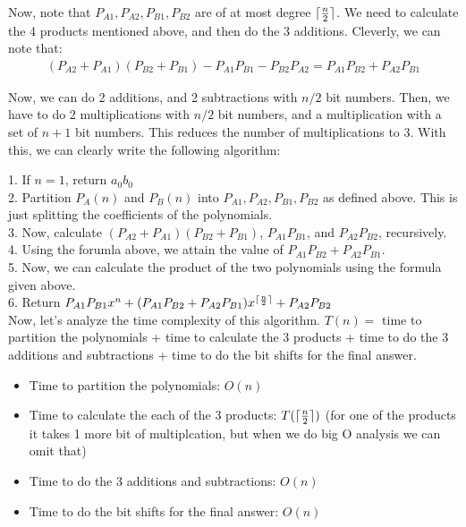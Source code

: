 \documentclass[a4paper]{article}
\DeclarePairedDelimiter{\ceil}{\lceil}{\rceil}
\begin{document}
\begin{enumerate}
    Now, note that $P_{A1}, P_{A2}, P_{B1}, P_{B2}$ are of at most degree $\ceil{\frac{n}{2}}$. We need to calculate the 4 products mentioned above, and then do the 3 additions. Cleverly, we can note that:
    \begin{align*}
        (P_{A2} + P_{A1})(P_{B2} + P_{B1}) - P_{A1}P_{B1} - P_{B2}P_{A2} = P_{A1}P_{B2} + P_{A2}P_{B1}
    \end{align*}

    Now, we can do 2 additions, and 2 subtractions with $n/2$ bit numbers. Then, we have to do 2 multiplications with $n/2$ bit numbers, and a multiplication with a set of $n+1$ bit numbers. This reduces the number of multiplications to 3. With this, we can clearly write the following algorithm:

    1. If $n = 1$, return $a_0b_0$\\
    2. Partition $P_A(n)$ and $P_B(n)$ into $P_{A1}, P_{A2}, P_{B1}, P_{B2}$ as defined above. This is just splitting the coefficients of the polynomials.\\
    3. Now, calculate $(P_{A2} + P_{A1})(P_{B2} + P_{B1})$, $P_{A1}P_{B1}$, and $P_{A2}P_{B2}$, recursively.\\
    4. Using the forumla above, we attain the value of $P_{A1}P_{B2} + P_{A2}P_{B1}$.\\
    5. Now, we can calculate the product of the two polynomials using the formula given above.\\
    6. Return $P_{A1}P_{B1}x^n + (P_{A1}P_{B2} + P_{A2}P_{B1})x^{\ceil{\frac{n}{2}}} + P_{A2}P_{B2}$\\

    Now, let's analyze the time complexity of this algorithm.
    $T(n) = $ time to partition the polynomials + time to calculate the 3 products + time to do the 3 additions and subtractions + time to do the bit shifts for the final answer.
    \begin{itemize}
        \item Time to partition the polynomials: $O(n)$
        \item Time to calculate the each of the 3 products: $T(\ceil{\frac{n}{2}})$ (for one of the products it takes 1 more bit of multiplcation, but when we do big O analysis we can omit that)
        \item Time to do the 3 additions and subtractions: $O(n)$
        \item Time to do the bit shifts for the final answer: $O(n)$
    \end{itemize}


\end{enumerate}
\end{document}
